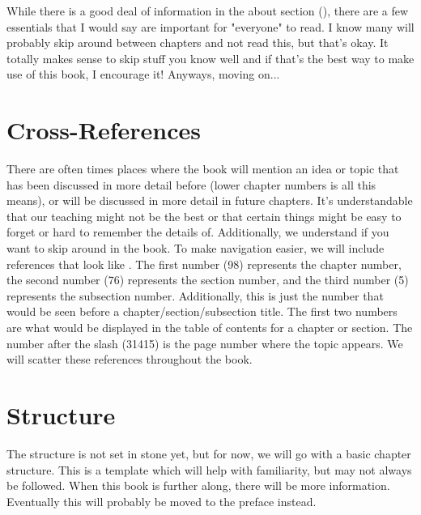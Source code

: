 \documentclass[../OpenAppliedMusicTheory.tex]{subfiles}
\begin{document}
    
    
    While there is a good deal of information in the about section (), there are a few essentials that I would say are important for "everyone" to read. I know many will probably skip around between chapters and not read this, but that's okay. It totally makes sense to skip stuff you know well and if that's the best way to make use of this book, I encourage it! Anyways, moving on...
    
    \section{Cross-References}\label{ch.0:references}
    There are often times places where the book will mention an idea or topic that has been discussed in more detail before (lower chapter numbers is all this means), or will be discussed in more detail in future chapters. It's understandable that our teaching might not be the best or that certain things might be easy to forget or hard to remember the details of. Additionally, we understand if you want to skip around in the book. To make navigation easier, we will include references that look like . The first number (98) represents the chapter number, the second number (76) represents the section number, and the third number (5) represents the subsection number. Additionally, this is just the number that would be seen before a chapter/section/subsection %
    title. The first two numbers are what would be displayed in the table of contents for a chapter or section. The number after the slash (31415) is the page number where the topic appears. We will scatter these references throughout the book.

    \section{Structure}\label{ch.0:structure}
    The structure is not set in stone yet, but for now, we will go with a basic chapter structure. This is a template which will help with familiarity, but may not always be followed. When this book is further along, there will be more information. Eventually this will probably be moved to the preface instead. %
\end{document}
